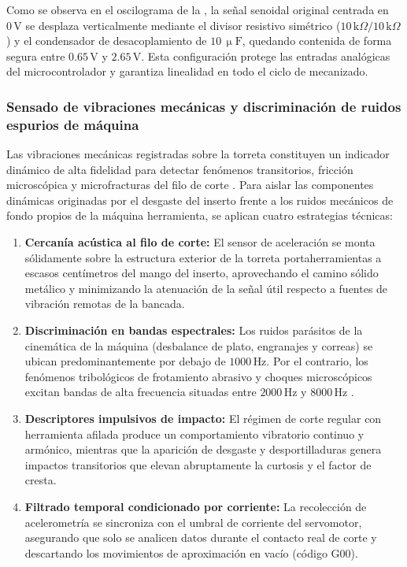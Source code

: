 
Como se observa en el oscilograma de la , la señal senoidal original centrada en $0\,\text{V}$ se desplaza verticalmente mediante el divisor resistivo simétrico ($10\,\text{k}\Omega / 10\,\text{k}\Omega$) y el condensador de desacoplamiento de $10\,\upmu\text{F}$, quedando contenida de forma segura entre $0.65\,\text{V}$ y $2.65\,\text{V}$. Esta configuración protege las entradas analógicas del microcontrolador y garantiza linealidad en todo el ciclo de mecanizado.

\subsubsection{Sensado de vibraciones mecánicas y discriminación de ruidos espurios de máquina}

Las vibraciones mecánicas registradas sobre la torreta constituyen un indicador dinámico de alta fidelidad para detectar fenómenos transitorios, fricción microscópica y microfracturas del filo de corte \citep{wang2024}. Para aislar las componentes dinámicas originadas por el desgaste del inserto frente a los ruidos mecánicos de fondo propios de la máquina herramienta, se aplican cuatro estrategias técnicas:

\begin{enumerate}
    \item \textbf{Cercanía acústica al filo de corte:} El sensor de aceleración se monta sólidamente sobre la estructura exterior de la torreta portaherramientas a escasos centímetros del mango del inserto, aprovechando el camino sólido metálico y minimizando la atenuación de la señal útil respecto a fuentes de vibración remotas de la bancada.
    \item \textbf{Discriminación en bandas espectrales:} Los ruidos parásitos de la cinemática de la máquina (desbalance de plato, engranajes y correas) se ubican predominantemente por debajo de $1000\,\text{Hz}$. Por el contrario, los fenómenos tribológicos de frotamiento abrasivo y choques microscópicos excitan bandas de alta frecuencia situadas entre $2000\,\text{Hz}$ y $8000\,\text{Hz}$ \citep{trejo2010, jia2025}.
    \item \textbf{Descriptores impulsivos de impacto:} El régimen de corte regular con herramienta afilada produce un comportamiento vibratorio continuo y armónico, mientras que la aparición de desgaste y desportilladuras genera impactos transitorios que elevan abruptamente la curtosis y el factor de cresta.
    \item \textbf{Filtrado temporal condicionado por corriente:} La recolección de acelerometría se sincroniza con el umbral de corriente del servomotor, asegurando que solo se analicen datos durante el contacto real de corte y descartando los movimientos de aproximación en vacío (código G00).
\end{enumerate}

